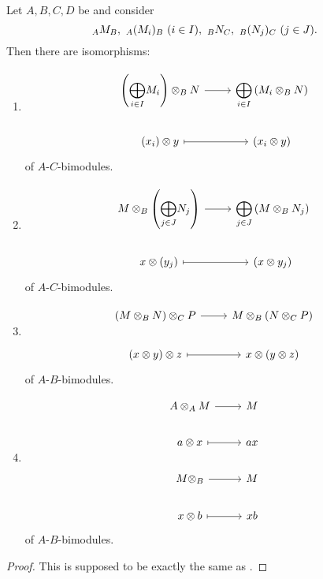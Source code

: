 \begin{lem}
  Let $A,B,C,D$ be  and consider
  \[
  \indmodule[A]{M}[B],~\indmodule[A]{(M_i)}[B]~(i\in I),~\indmodule[B]{N}[C],~\indmodule[B]{(N_j)}[C]~(j\in J).
  \]
  Then there are isomorphisms:
  \begin{enumerate}
    \item
  \[
  \begin{tikzcd}
  \left({\displaystyle\bigoplus_{i\in I}}M_i\right)\otimes_B N \ar{r}& {\displaystyle\bigoplus_{i\in I}}\left(M_i\otimes_BN\right)\\
  (x_i)\otimes y \ar[mapsto]{r}& (x_i\otimes y)\end{tikzcd}
  \]
  of $A$-$C$-bimodules.
  \item
  \[
  \begin{tikzcd}
    M\otimes_B\left({\displaystyle \bigoplus_{j\in J}}N_j\right)\ar{r}&{\displaystyle \bigoplus_{j\in J}}\left(M\otimes_BN_j\right)\\
    x\otimes (y_j)\ar[mapsto]{r}&(x\otimes y_j)
  \end{tikzcd}
  \]
  of $A$-$C$-bimodules.
  \item
  \[
  \begin{tikzcd}
  (M\otimes_BN)\otimes_CP\ar{r}&M\otimes_B(N\otimes_CP)\\
  (x\otimes y)\otimes z \ar[mapsto]{r}&x\otimes(y\otimes z)
  \end{tikzcd}
  \]
  of $A$-$B$-bimodules.
  \item
  \[
  \begin{tikzcd}
    A\otimes_AM\ar{r}&M\\
    a\otimes x\ar[mapsto]{r}&ax\\
    M\otimes_B\ar{r}&M\\
    x\otimes b\ar[mapsto]{r}&xb
  \end{tikzcd}
\] of $A$-$B$-bimodules.
\end{enumerate}
\end{lem}
\begin{proof}
  This is \color{red} supposed to be{}\color{black} exactly the same as \cite[2.27]{franzen}.
\end{proof}

